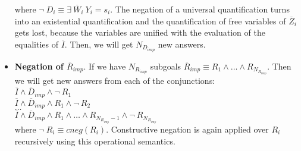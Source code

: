 \documentclass{llncs}
\begin{document}
\begin{itemize}
           where $ \neg~ D_i \equiv \exists~
           \overline{W}_i~ Y_i = s_i$. The negation of a universal
           quantification turns into an existential quantification and
           the quantification of free variables of $\overline{Z}_i$
           gets lost, because the variables are unified with the evaluation of
           the equalities of $\overline{I}$. Then, we will get
           $N_{D_{imp}}$ new answers.


           \item {\bf Negation of $\overline{R}_{imp}$}. If we have
           $N_{R_{imp}}$ subgoals $\overline{R}_{imp} \equiv R_1
           \wedge \ldots \wedge R_{N_{R_{imp}}}$. Then we will get
           new answers from each of the conjunctions: \\

           $\overline{I} \wedge \overline{D}_{imp} \wedge \neg~ R_1 $ \\ 
           $\overline{I} \wedge \overline{D}_{imp} \wedge
           R_1 \wedge \neg~ R_2 $ \\ 
           $\ldots $ \\ 
           $\overline{I} \wedge \overline{D}_{imp} \wedge
           R_1 \wedge \ldots \wedge R_{N_{R_{imp}}-1} \wedge \neg~
           R_{N_{R_{imp}}}$ \\ 

           where $ \neg~ R_i \equiv cneg(R_i)$. Constructive negation
           is again applied over $R_i$ recursively using this
           operational semantics.



\end{itemize}
\end{document}
